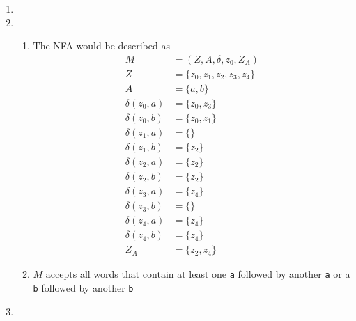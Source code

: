 \documentclass{article}
\begin{document}

    \begin{tasks}
        \begin{enumerate}
            \item 
            \item \begin{enumerate}[label={\color{tcum}(\arabic*)}]
                    \item The NFA would be described as
                        \begin{displaymath}
                            \begin{aligned}
                                M &= (Z, A, \delta, z_0, Z_A) \\
                                Z &= \{z_0, z_1, z_2, z_3, z_4\} \\
                                A &= \{a, b\} \\
                                \delta(z_0, a) &= \{z_0, z_3\} \\
                                \delta(z_0, b) &= \{z_0, z_1\} \\
                                \delta(z_1, a) &= \{\} \\
                                \delta(z_1, b) &= \{z_2\} \\
                                \delta(z_2, a) &= \{z_2\} \\
                                \delta(z_2, b) &= \{z_2\} \\
                                \delta(z_3, a) &= \{z_4\} \\
                                \delta(z_3, b) &= \{\} \\
                                \delta(z_4, a) &= \{z_4\} \\
                                \delta(z_4, b) &= \{z_4\} \\
                                Z_A &= \{z_2, z_4\}
                            \end{aligned}
                        \end{displaymath}
                    \item \(M\) accepts all words that contain at least one {\color{hilight}\verb|a|} followed by another {\color{hilight}\verb|a|} or a {\color{hilight}\verb|b|} followed by another {\color{hilight}\verb|b|}
                \end{enumerate}
            \item \mbox{}

\end{enumerate}
\end{tasks}
\end{document}
